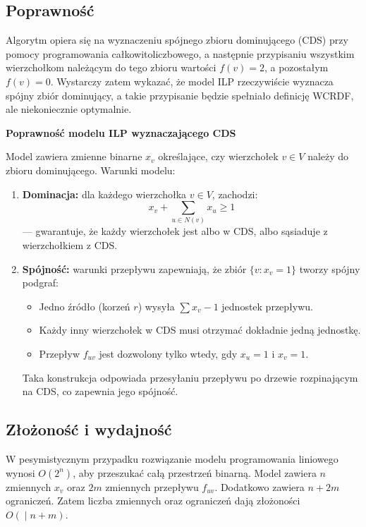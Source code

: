 \subsection{Poprawność}

Algorytm opiera się na wyznaczeniu spójnego zbioru dominującego (CDS) przy pomocy programowania całkowitoliczbowego, a następnie przypisaniu wszystkim wierzchołkom należącym do tego zbioru wartości \( f(v) = 2 \), a pozostałym \( f(v) = 0 \). Wystarczy zatem wykazać, że model ILP rzeczywiście wyznacza spójny zbiór dominujący, a takie przypisanie będzie spełniało definicję WCRDF, ale niekoniecznie optymalnie.

\textbf{Poprawność modelu ILP wyznaczającego CDS}

Model zawiera zmienne binarne \( x_v \) określające, czy wierzchołek \( v \in V \) należy do zbioru dominującego. Warunki modelu:

\begin{enumerate}
    \item \textbf{Dominacja:} dla każdego wierzchołka \( v \in V \), zachodzi:
    \[
    x_v + \sum_{u \in N(v)} x_u \geq 1
    \]
    — gwarantuje, że każdy wierzchołek jest albo w CDS, albo sąsiaduje z wierzchołkiem z CDS.

    \item \textbf{Spójność:} warunki przepływu zapewniają, że zbiór \( \{v : x_v = 1\} \) tworzy spójny podgraf:
    \begin{itemize}
        \item Jedno źródło (korzeń \( r \)) wysyła \( \sum x_v - 1 \) jednostek przepływu.
        \item Każdy inny wierzchołek w CDS musi otrzymać dokładnie jedną jednostkę.
        \item Przepływ \( f_{uv} \) jest dozwolony tylko wtedy, gdy \( x_u = 1 \) i \( x_v = 1 \).
    \end{itemize}
    Taka konstrukcja odpowiada przesyłaniu przepływu po drzewie rozpinającym na CDS, co zapewnia jego spójność.
\end{enumerate}

\subsection{Złożoność i wydajność}

W pesymistycznym przypadku rozwiązanie modelu programowania liniowego wynosi $O(2^n)$, aby przeszukać całą przestrzeń binarną. Model zawiera $n$ zmiennych $x_v$ oraz $2m$ zmiennych przepływu $f_{uv}$. Dodatkowo zawiera $n + 2m$ ograniczeń. Zatem liczba zmiennych oraz ograniczeń dają złożoności $O(∣n+m)$.


